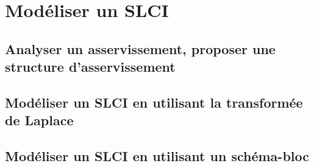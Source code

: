 \graphicspath{{\repStyle/png/}{../TEC/TEC-05/16_Poussoir/images/}} 
 
 
\graphicspath{{\repStyle/png/}{../TEC/TEC-05/17_4Barres/images/}} 
 
 
\graphicspath{{\repStyle/png/}{../TEC/TEC-05/18_Maxpid/images/}} 
 
 
\graphicspath{{\repStyle/png/}{../TEC/TEC-05/19_Graham/images/}} 
 
 
\graphicspath{{\repStyle/png/}{../TEC/TEC-05/20_VariateurBilles/images/}} 
 
 
\graphicspath{{\repStyle/png/}{../TEC/TEC-05/49_ElevateurBateaux/images/}} 
 
 
\graphicspath{{\repStyle/png/}{../TEC/TEC-05/50_BancBalafre/images/}} 
 
 
\graphicspath{{\repStyle/png/}{../TEC/TEC-05/64_EPAS/images/}} 
 
 
\setchapterpreamble[u]{\margintoc} 
\chapter{Modéliser un SLCI} 
\section{Analyser un asservissement, proposer une structure d'asservissement} 
\section{Modéliser un SLCI en utilisant la transformée de Laplace} 
\graphicspath{{\repStyle/png/}{../SLCI/SLCI-02-FT/51_MCC/images/}} 
 
 
\section{Modéliser un SLCI en utilisant un schéma-bloc} 
\graphicspath{{\repStyle/png/}{../SLCI/SLCI-03-SchemaBlocs/39_SeineMusicale/images/}} 
 
 
\graphicspath{{\repStyle/png/}{../SLCI/SLCI-03-SchemaBlocs/47_SysReeduc/images/}} 
 
 
